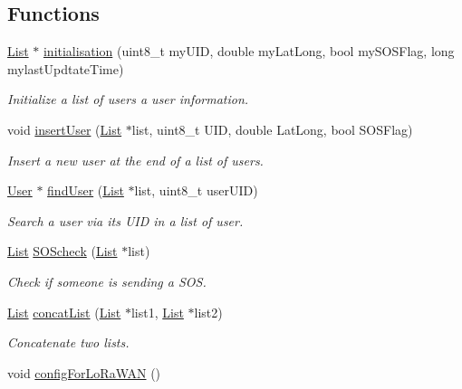 \subsection*{Functions}
\begin{DoxyCompactItemize}
\item 
\hyperlink{struct_list}{List} $\ast$ \hyperlink{_lo_ra_ultra_team_8ino_aa2d915319a07c3510297074a55d04ea8}{initialisation} (uint8\+\_\+t my\+U\+ID, double my\+Lat\+Long, bool my\+S\+O\+S\+Flag, long mylast\+Updtate\+Time)
\begin{DoxyCompactList}\small\item\em Initialize a list of users a user information. \end{DoxyCompactList}\item 
void \hyperlink{_lo_ra_ultra_team_8ino_a438d0ba126f16b41137b8d63abd3500d}{insert\+User} (\hyperlink{struct_list}{List} $\ast$list, uint8\+\_\+t U\+ID, double Lat\+Long, bool S\+O\+S\+Flag)
\begin{DoxyCompactList}\small\item\em Insert a new user at the end of a list of users. \end{DoxyCompactList}\item 
\hyperlink{struct_user}{User} $\ast$ \hyperlink{_lo_ra_ultra_team_8ino_a1f547e5be0e0ff339a1bf2db33e23a4f}{find\+User} (\hyperlink{struct_list}{List} $\ast$list, uint8\+\_\+t user\+U\+ID)
\begin{DoxyCompactList}\small\item\em Search a user via its U\+ID in a list of user. \end{DoxyCompactList}\item 
\hyperlink{struct_list}{List} \hyperlink{_lo_ra_ultra_team_8ino_a27d82402e7eba33704c9a8d603af8094}{S\+O\+Scheck} (\hyperlink{struct_list}{List} $\ast$list)
\begin{DoxyCompactList}\small\item\em Check if someone is sending a S\+OS. \end{DoxyCompactList}\item 
\hyperlink{struct_list}{List} \hyperlink{_lo_ra_ultra_team_8ino_a011b19557d6ef2b70c305e7d5167d1cd}{concat\+List} (\hyperlink{struct_list}{List} $\ast$list1, \hyperlink{struct_list}{List} $\ast$list2)
\begin{DoxyCompactList}\small\item\em Concatenate two lists. \end{DoxyCompactList}\item 
void \hyperlink{_lo_ra_ultra_team_8ino_aa5f0d33b47a719329980682d96a56280}{config\+For\+Lo\+Ra\+W\+AN} ()

\end{DoxyCompactItemize}
